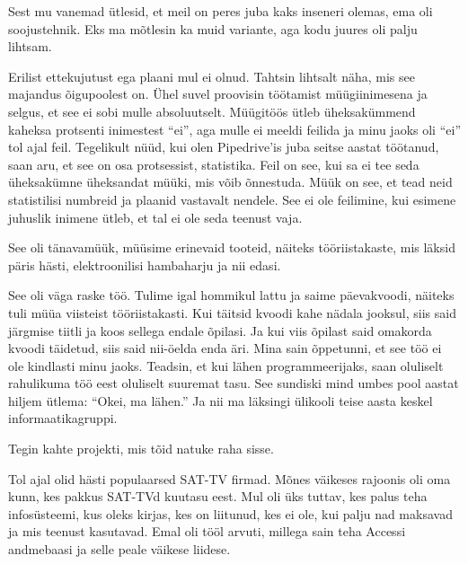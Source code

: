 
Sest mu vanemad ütlesid, et meil on peres juba kaks inseneri olemas, ema oli 
soojustehnik. Eks ma mõtlesin ka muid variante, aga kodu juures 
oli palju lihtsam. 


Erilist ettekujutust ega plaani mul ei olnud. Tahtsin lihtsalt näha, mis see majandus 
õigupoolest on. Ühel suvel proovisin töötamist müügiinimesena ja selgus, et 
see ei sobi mulle absoluutselt. Müügitöös ütleb 
üheksakümmend kaheksa protsenti inimestest \enquote{ei}, aga mulle ei 
meeldi feilida ja minu jaoks oli \enquote{ei} tol ajal feil. 
Tegelikult nüüd, kui olen Pipedrive'is juba seitse 
aastat töötanud, saan aru, et see on osa protsessist, statistika. Feil on see, kui sa ei tee seda üheksakümne üheksandat 
müüki, mis võib õnnestuda. Müük on see, et tead neid statistilisi 
numbreid ja plaanid vastavalt nendele. See ei ole feilimine, kui esimene juhuslik 
inimene ütleb, et tal ei ole seda teenust vaja.


See oli tänavamüük, müüsime erinevaid tooteid, näiteks 
tööriistakaste, mis läksid päris hästi, 
elektroonilisi hambaharju ja nii edasi.


See oli väga raske töö. Tulime igal hommikul lattu ja saime päeva{\-}kvoodi, näiteks tuli müüa viisteist 
tööriistakasti. Kui täitsid kvoodi kahe nädala jooksul, siis 
said järgmise tiitli ja koos sellega endale õpilasi. Ja kui viis 
õpilast said omakorda kvoodi täidetud, siis said 
nii-öelda enda äri. Mina sain õppetunni, et see töö ei ole kindlasti minu 
jaoks. Teadsin, et kui lähen programmeerijaks, saan oluliselt 
rahulikuma töö eest oluliselt suuremat tasu. See sundiski mind umbes 
pool aastat hiljem ütlema: \enquote{Okei, ma lähen.} Ja nii ma läksingi ülikooli 
teise aasta keskel informaatikagruppi.


Tegin kahte projekti, mis tõid natuke raha sisse.

Tol ajal olid hästi populaarsed 
SAT-TV firmad. Mõnes 
väikeses rajoonis oli oma kunn, kes pakkus SAT-TVd kuutasu eest. 
Mul oli üks tuttav, kes palus teha infosüsteemi, kus oleks kirjas, kes on 
liitunud, kes ei ole, kui palju nad maksavad ja mis teenust kasutavad. 
Emal oli tööl arvuti, millega sain teha Accessi andmebaasi ja selle peale väikese liidese.


